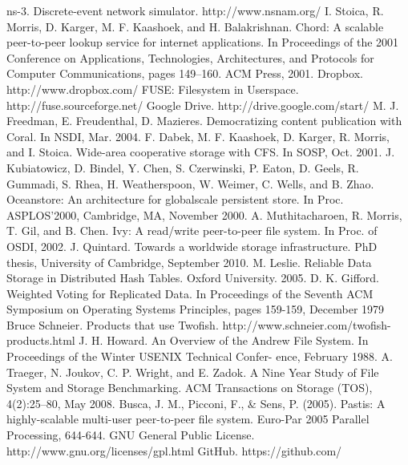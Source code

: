 \documentclass[8pt,a4paper]{article}
\begin{document}

\begin{thebibliography}{10}
ns-3. Discrete-event network simulator. http://www.nsnam.org/
I. Stoica, R. Morris, D. Karger, M. F. Kaashoek, and
H. Balakrishnan. Chord: A scalable peer-to-peer lookup
service for internet applications. In Proceedings of the 2001
Conference on Applications, Technologies, Architectures,
and Protocols for Computer Communications, pages
149–160. ACM Press, 2001.
Dropbox. http://www.dropbox.com/
FUSE: Filesystem in Userspace. http://fuse.sourceforge.net/ 
Google Drive. http://drive.google.com/start/
M. J. Freedman, E. Freudenthal, D. Mazieres.
Democratizing content publication with Coral.
In NSDI, Mar. 2004.
F. Dabek, M. F. Kaashoek, D. Karger, R. Morris, and I. Stoica. Wide-area
cooperative storage with CFS. In SOSP, Oct. 2001.
J. Kubiatowicz, D. Bindel, Y. Chen, S. Czerwinski, P. Eaton, D. Geels, R. Gummadi, S. Rhea,
H. Weatherspoon, W. Weimer, C. Wells, and B. Zhao. Oceanstore: An architecture for globalscale persistent store. In Proc. ASPLOS’2000, Cambridge, MA, November 2000.
A. Muthitacharoen, R. Morris, T. Gil, and B. Chen. 
Ivy: A read/write peer-to-peer file system. 
In Proc. of OSDI, 2002.
J. Quintard. Towards a worldwide storage infrastructure.
PhD thesis, University of Cambridge, September 2010.
M. Leslie.
Reliable Data Storage in Distributed Hash Tables. Oxford University. 2005.
D. K. Gifford. Weighted Voting for Replicated 
Data. In Proceedings of the Seventh ACM 
Symposium on Operating Systems Principles, 
pages 159-159, December 1979
Bruce Schneier. Products that use Twofish. http://www.schneier.com/twofish-products.html
J. H. Howard. An Overview of the Andrew File System.
In Proceedings of the Winter USENIX Technical Confer-
ence, February 1988.
A. Traeger, N. Joukov, C. P. Wright, and E. Zadok. A
Nine Year Study of File System and Storage Benchmarking. ACM Transactions on Storage (TOS), 4(2):25–80,
May 2008.
Busca, J. M., Picconi, F., \& Sens, P. (2005). Pastis: A highly-scalable multi-user peer-to-peer file system. Euro-Par 2005 Parallel Processing, 644-644.
GNU General Public License. http://www.gnu.org/licenses/gpl.html
GitHub. https://github.com/ 
\end{thebibliography}
\end{document}
